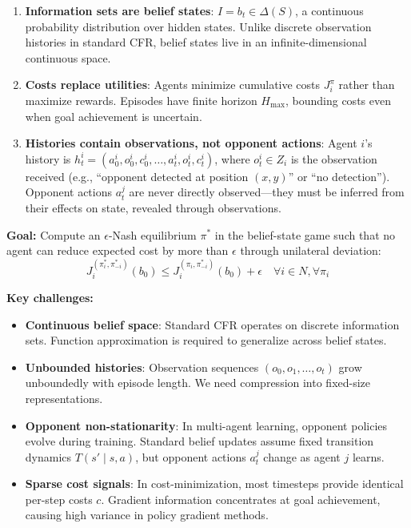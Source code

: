 \documentclass{article}
\begin{document}
\begin{enumerate}
    \item \textbf{Information sets are belief states}: $I = b_t \in \Delta(S)$, a continuous probability distribution over hidden states. Unlike discrete observation histories in standard CFR, belief states live in an infinite-dimensional continuous space.
    
    \item \textbf{Costs replace utilities}: Agents minimize cumulative costs $J_i^\pi$ rather than maximize rewards. Episodes have finite horizon $H_{\max}$, bounding costs even when goal achievement is uncertain.
    
    \item \textbf{Histories contain observations, not opponent actions}: Agent $i$'s history is $h_t^i = (a_0^i, o_0^i, c_0^i, \ldots, a_t^i, o_t^i, c_t^i)$, where $o_t^i \in Z_i$ is the observation received (e.g., ``opponent detected at position $(x,y)$'' or ``no detection''). Opponent actions $a_t^j$ are never directly observed---they must be inferred from their effects on state, revealed through observations.
\end{enumerate}

\textbf{Goal:} Compute an $\epsilon$-Nash equilibrium $\pi^*$ in the belief-state game such that no agent can reduce expected cost by more than $\epsilon$ through unilateral deviation:
\begin{equation}
J_i^{(\pi_i^*, \pi_{-i}^*)}(b_0) \leq J_i^{(\pi_i, \pi_{-i}^*)}(b_0) + \epsilon \quad \forall i \in N, \forall \pi_i
\end{equation}

\textbf{Key challenges:}
\begin{itemize}
    \item \textbf{Continuous belief space}: Standard CFR operates on discrete information sets. Function approximation is required to generalize across belief states.
    \item \textbf{Unbounded histories}: Observation sequences $(o_0, o_1, \ldots, o_t)$ grow unboundedly with episode length. We need compression into fixed-size representations.
    \item \textbf{Opponent non-stationarity}: In multi-agent learning, opponent policies evolve during training. Standard belief updates assume fixed transition dynamics $T(s' \mid s,a)$, but opponent actions $a_t^j$ change as agent $j$ learns.
    \item \textbf{Sparse cost signals}: In cost-minimization, most timesteps provide identical per-step costs $c$. Gradient information concentrates at goal achievement, causing high variance in policy gradient methods.
\end{itemize}
\end{document}

